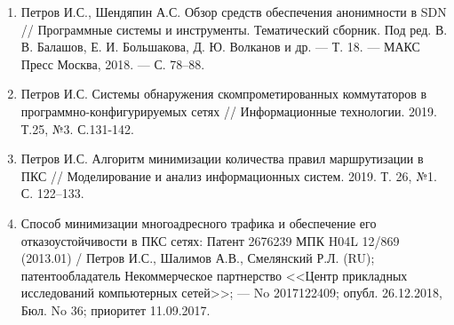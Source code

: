 \documentclass[14pt,autoref,href]{disser}
\theoremstyle{definition}
\begin{document}
\begin{spacing}{1.47}
\begin{enumerate}
\item Петров И.С., Шендяпин А.С. Обзор средств обеспечения анонимности в SDN // Программные системы и инструменты. Тематический сборник. Под ред. В. В. Балашов, Е. И. Большакова, Д. Ю. Волканов и др. — Т. 18. — МАКС Пресс Москва, 2018. — С. 78–88.

\item Петров И.С. Системы обнаружения скомпрометированных коммутаторов в программно-конфигурируемых сетях // Информационные технологии. 2019. Т.25, №3. С.131-142.

\item Петров И.С. Алгоритм минимизации количества правил маршрутизации в ПКС // Моделирование и анализ информационных систем. 2019. Т. 26, №1. С. 122–133.

\item Способ минимизации многоадресного трафика и обеспечение его отказоустойчивости в ПКС сетях: Патент 2676239 МПК H04L 12/869 (2013.01) / Петров И.С., Шалимов А.В., Смелянский Р.Л. (RU); патентообладатель Некоммерческое партнерство <<Центр прикладных исследований компьютерных сетей>>; — No 2017122409; опубл. 26.12.2018, Бюл. No 36; приоритет 11.09.2017.
\end{enumerate}
\end{spacing}
\end{document}
